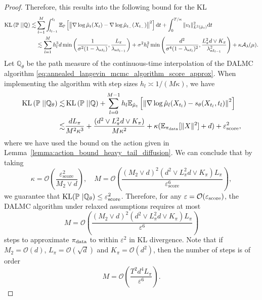 \begin{proof}
Therefore, this results into the following bound for the \gls*{KL}
\begin{align*}
    \operatorname*{KL}\left(\mathbb{P}\;||\mathbb{Q}\right)\lesssim & \sum_{l=1}^M \int_{t_{l-1}}^{t_l} \mathbb{E}_{\mathbb{P}}  \left[\left\Vert \nabla\log \hat{\mu}_t(X_t)-\nabla \log \hat{\mu}_{t_-}(X_{t_-})\right\Vert^2\right]\mathrm{d} t + \int_0^{T/\kappa} \Vert v_t\Vert^2_{L^2({\hat{\mu}}_t)} \mathrm{d} t\\
    &\lesssim \sum_{l=1}^M h_l^3 d\min\left(\frac{1}{\sigma^2(1-\lambda_{\kappa t_{l}})}, \frac{L_\pi}{\lambda_{\kappa t_{l-1}}}\right) + \sigma^2 h_l^2 \min \left(\frac{d^2}{\sigma^4(1-\lambda_{\kappa t_{l}})^2}, \frac{L_\pi^2 d \vee K_\pi}{\lambda_{\kappa t_{l-1}}^2}\right)+  \kappa \mathcal{A}_{\lambda}(\mu).  
\end{align*}
Let $\mathbb{Q}_\theta$ be the path measure of the continuous-time interpolation of the \gls*{DALMC} algorithm \eqref{eq:annealed_langevin_mcmc_algorithm_score_approx}. When implementing the algorithm with step sizes $h_l\asymp 1/( M \kappa)$, we have
\begin{align*}
    \operatorname*{KL}\left(\mathbb{P}\;||\mathbb{Q}_\theta\right)\lesssim & \operatorname*{KL}\left(\mathbb{P}\;||\mathbb{Q}\right) + \sum_{l=0}^{M-1} h_l\mathbb{E}_{\hat{\mu}_t}\left[\left\Vert \nabla \log \hat{\mu}_l(X_{t_l}) - s_\theta(X_{t_l}, t_l)\right\Vert^2\right]
    \\\lesssim &\frac{dL_\pi}{M^2\kappa^3} + \frac{(d^2\vee L_\pi^2d \vee K_\pi)}{M\kappa^2} + \kappa (\mathbb{E}_{\operatorname*{\pi_{\text{data}}}}[\Vert X\Vert^2] + d) + \varepsilon_{\text{score}}^2,
\end{align*}
where we have used the bound on the action given in Lemma~\ref{lemma:action_bound_heavy_tail_diffusion}.
We can conclude that by taking
\begin{equation*}
    \kappa = \mathcal{O}\left(\frac{\varepsilon_{\text{score}}^2}{M_2 \vee d}\right),\quad M = \mathcal{O}\left(\frac{(M_2 \vee d)^2(d^2\vee L_\pi^2d \vee K_\pi) L_\pi}{\varepsilon_{\text{score}}^6}\right),
\end{equation*}
we guarantee that $\operatorname*{KL}(\mathbb{P}\ \vert \mathbb{Q}_\theta)\leq \varepsilon_{\text{score}}^2$. 
Therefore, for any $\varepsilon = \mathcal{O}(\varepsilon_{\operatorname*{\text{score}}})$, the \gls*{DALMC} algorithm under relaxed assumptions requires at most 
\begin{equation*}
     M = \mathcal{O}\left(\frac{(M_2 \vee d)^2(d^2\vee L_\pi^2d \vee K_\pi) L_\pi}{\varepsilon^6}\right)
\end{equation*}
steps to approximate $\operatorname*{\pi_{\text{data}}}$ to within $\varepsilon^2$ in \gls*{KL} divergence.
Note that if $M_2= \mathcal{O}(d)$, $L_\pi=\mathcal{O}(\sqrt{d})$ and $K_\pi= \mathcal{O}(d^2)$, then the number of steps is of order 
\begin{equation*}
    M = \mathcal{O}\left(\frac{T^2 d^4L_\pi}{\varepsilon^6}\right).
\end{equation*}
\end{proof}
